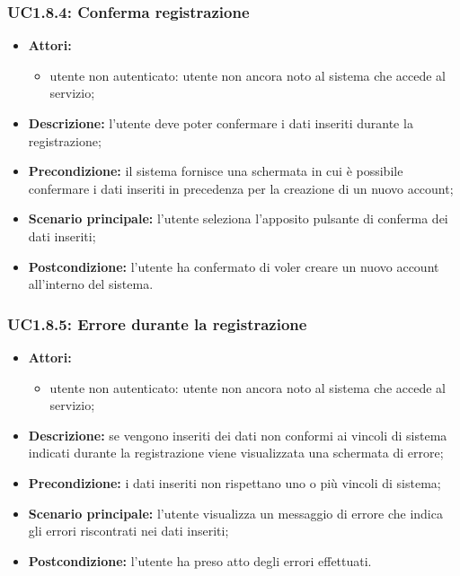 \subsubsection{UC1.8.4: Conferma registrazione}
\begin{itemize}
	\item \textbf{Attori:}
	\begin{itemize}
		\item utente non autenticato: utente non ancora noto al sistema che accede al servizio;
	\end{itemize}
	\item \textbf{Descrizione:} l'utente deve poter confermare i dati inseriti durante la registrazione;
	\item \textbf{Precondizione:} il sistema fornisce una schermata in cui è possibile confermare i dati inseriti in precedenza per la creazione di un nuovo account;
	\item \textbf{Scenario principale:} l'utente seleziona l'apposito pulsante di conferma dei dati inseriti;
	\item \textbf{Postcondizione:} l'utente ha confermato di voler creare un nuovo account all'interno del sistema.
\end{itemize}

\subsubsection{UC1.8.5: Errore durante la registrazione}
\begin{itemize}
	\item \textbf{Attori:}
	\begin{itemize}
		\item utente non autenticato: utente non ancora noto al sistema che accede al servizio;
	\end{itemize}
	\item \textbf{Descrizione:} se vengono inseriti dei dati non conformi ai vincoli di sistema indicati durante la registrazione viene visualizzata una schermata di errore;
	\item \textbf{Precondizione:} i dati inseriti non rispettano uno o più vincoli di sistema;
	\item \textbf{Scenario principale:} l'utente visualizza un messaggio di errore che indica gli errori riscontrati nei dati inseriti;
	\item \textbf{Postcondizione:} l'utente ha preso atto degli errori effettuati.
\end{itemize}

